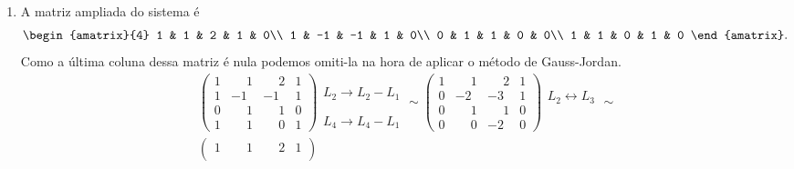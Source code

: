 \begin{exemplo}
\begin{solucao}
\begin{enumerate}
            \item A matriz ampliada do sistema é
                \[
                    \begin{amatrix}{4}
                        1 & 1 & 2 & 1 & 0\\
                        1 & -1 & -1 & 1 & 0\\
                        0 & 1 & 1 & 0 & 0\\
                        1 & 1 & 0 & 1 & 0
                    \end{amatrix}.
                \]
            Como a última coluna dessa matriz é nula podemos omiti-la na hora de aplicar o método de Gauss-Jordan.
            \begin{align*}
                &\begin{pmatrix}
                    1 &\phantom{-} 1 &\phantom{-} 2 & 1\\
                    1 & -1 & -1 & 1\\
                    0 &\phantom{-} 1 &\phantom{-} 1 & 0\\
                    1 &\phantom{-} 1 &\phantom{-} 0 & 1
                \end{pmatrix}
                \begin{array}{l}
                    \phantom{x}\\L_2 \to L_2 - L_1\\\phantom{x}\\L_4 \to L_4 - L_1
                \end{array}\sim
                \begin{pmatrix}
                    1 &\phantom{-} 1 &\phantom{-} 2 & 1\\
                    0 & -2 & -3 & 1\\
                    0 &\phantom{-} 1 &\phantom{-} 1 & 0\\
                    0 &\phantom{-} 0 & -2 & 0
                \end{pmatrix}
                \begin{array}{l}
                    \phantom{x}\\L_2 \leftrightarrow L_3\\\phantom{x}\\\phantom{x}
                \end{array}\sim\\
                &\begin{pmatrix}
                    1 &\phantom{-} 1 &\phantom{-} 2 & 1\\

\end{pmatrix}
\end{align*}
\end{enumerate}
\end{solucao}
\end{exemplo}
